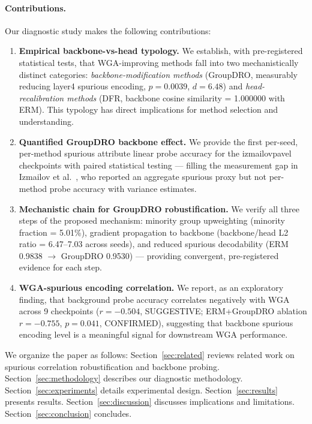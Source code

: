 \paragraph{Contributions.} Our diagnostic study makes the following contributions:

\begin{enumerate}
\item \textbf{Empirical backbone-vs-head typology.} We establish, with pre-registered statistical tests, that WGA-improving methods fall into two mechanistically distinct categories: \emph{backbone-modification methods} (GroupDRO, measurably reducing layer4 spurious encoding, $p = 0.0039$, $d = 6.48$) and \emph{head-recalibration methods} (DFR, backbone cosine similarity = 1.000000 with ERM). This typology has direct implications for method selection and understanding.

\item \textbf{Quantified GroupDRO backbone effect.} We provide the first per-seed, per-method spurious attribute linear probe accuracy for the izmailovpavel checkpoints with paired statistical testing --- filling the measurement gap in Izmailov et al.\ \cite{izmailov2022feature}, who reported an aggregate spurious proxy but not per-method probe accuracy with variance estimates.

\item \textbf{Mechanistic chain for GroupDRO robustification.} We verify all three steps of the proposed mechanism: minority group upweighting (minority fraction = 5.01\%), gradient propagation to backbone (backbone/head L2 ratio = 6.47--7.03 across seeds), and reduced spurious decodability (ERM 0.9838 $\to$ GroupDRO 0.9530) --- providing convergent, pre-registered evidence for each step.

\item \textbf{WGA-spurious encoding correlation.} We report, as an exploratory finding, that background probe accuracy correlates negatively with WGA across 9 checkpoints ($r = -0.504$, SUGGESTIVE; ERM+GroupDRO ablation $r = -0.755$, $p = 0.041$, CONFIRMED), suggesting that backbone spurious encoding level is a meaningful signal for downstream WGA performance.
\end{enumerate}

We organize the paper as follows: Section~\ref{sec:related} reviews related work on spurious correlation robustification and backbone probing. Section~\ref{sec:methodology} describes our diagnostic methodology. Section~\ref{sec:experiments} details experimental design. Section~\ref{sec:results} presents results. Section~\ref{sec:discussion} discusses implications and limitations. Section~\ref{sec:conclusion} concludes.
